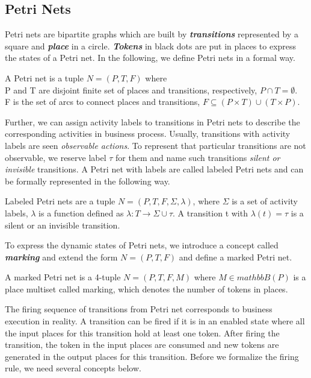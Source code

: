 \subsection{Petri Nets}
Petri nets are bipartite graphs which are built by \textbf{\emph{transitions}} represented by a square and \textbf{\emph{place}} in a circle. \textbf{\emph{Tokens}} in black dots are put in places to express the states of a Petri net. In the following, we define Petri nets in a formal way.
\begin{definition}
	A Petri net is a tuple $N=(P,T,F)$ where \\ P and T are disjoint finite set of  places and transitions, respectively, $P \cap T = \emptyset $. \\ F is the set of arcs to connect places and transitions, $F \subseteq (P\times T)\cup (T \times P)$.
\end{definition}
Further, we can assign activity labels to transitions in Petri nets to describe the corresponding activities in business process. Usually, transitions with activity labels are seen \emph{observable actions}. To represent that particular transitions are not observable, we reserve label $\tau$ for them and name such transitions \emph{silent or invisible} transitions. A Petri net with labels are called labeled Petri nets and can be formally represented in the following way.
\begin{definition}	
	Labeled Petri nets are a tuple $N=(P,T,F, \Sigma, \lambda)$, where $\Sigma$ is a set of activity labels, $\lambda$ is a function defined as $\lambda: T \rightarrow \Sigma \cup \tau$. A transition t with $\lambda(t)=\tau$ is a silent or an invisible transition.
\end{definition}
To express the dynamic states of Petri nets, we introduce a concept called \textbf{\emph{marking}} and extend the form  $N=(P,T,F)$ and define a marked Petri net. 
\begin{definition}
A marked Petri net is a 4-tuple $N=(P,T,F,M)$ where $M \in mathbb{B(P)}$ is a place multiset called marking, which denotes the number of tokens in places.
\end{definition}
The firing sequence of transitions from Petri net corresponds to business execution in reality. A transition can be fired if it is in an enabled state where all the input places for this transition hold at least one token. After firing the transition, the token in the input places are consumed and new tokens are generated in the output places for this transition. Before we formalize the firing rule, we need several concepts below.
